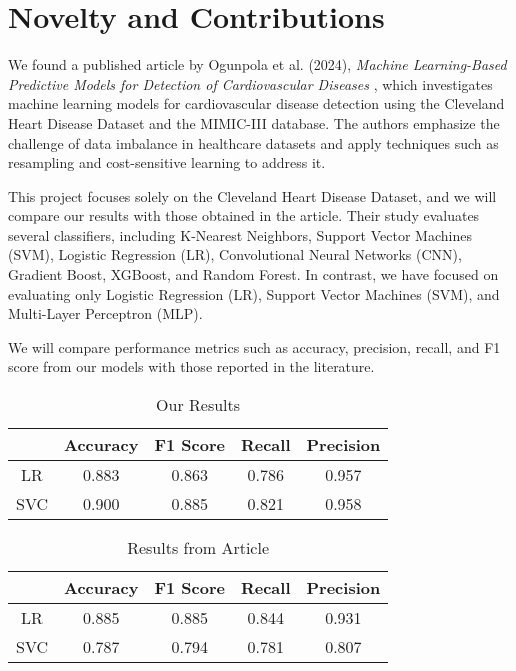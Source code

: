 \section{Novelty and Contributions}
We found a published article by Ogunpola et al. (2024), \textit{Machine Learning-Based Predictive Models for Detection of Cardiovascular Diseases} \cite{ogunpola2024machine}, which investigates machine learning models for cardiovascular disease detection using the Cleveland Heart Disease Dataset and the MIMIC-III database. The authors emphasize the challenge of data imbalance in healthcare datasets and apply techniques such as resampling and cost-sensitive learning to address it.

This project focuses solely on the Cleveland Heart Disease Dataset, and we will compare our results with those obtained in the article. Their study evaluates several classifiers, including K-Nearest Neighbors, Support Vector Machines (SVM), Logistic Regression (LR), Convolutional Neural Networks (CNN), Gradient Boost, XGBoost, and Random Forest. In contrast, we have focused on evaluating only Logistic Regression (LR), Support Vector Machines (SVM), and Multi-Layer Perceptron (MLP).

We will compare performance metrics such as accuracy, precision, recall, and F1 score from our models with those reported in the literature.

\begin{table}[H]
    \centering
    \caption{Our Results} 
    \begin{tabular}{||c| c c c c||} 
     \hline
     & Accuracy & F1 Score & Recall & Precision \\
     \hline\hline
     LR & 0.883 & 0.863 & 0.786 & 0.957 \\ 
     \hline
    SVC & 0.900 & 0.885 & 0.821 & 0.958  \\
    \hline
    \hline
    \end{tabular}
    \label{tab:tab_our results}
\end{table}

\begin{table}[H]
    \centering
    \caption{Results from Article} 
    \begin{tabular}{||c| c c c c||} 
     \hline
     & Accuracy & F1 Score & Recall & Precision \\
     \hline\hline
     LR & 0.885 & 0.885 & 0.844 & 0.931 \\ 
     \hline
    SVC & 0.787 & 0.794 & 0.781 & 0.807 \\
    \hline
    \hline
    \end{tabular}
    \label{tab:tab_our results}
\end{table}

